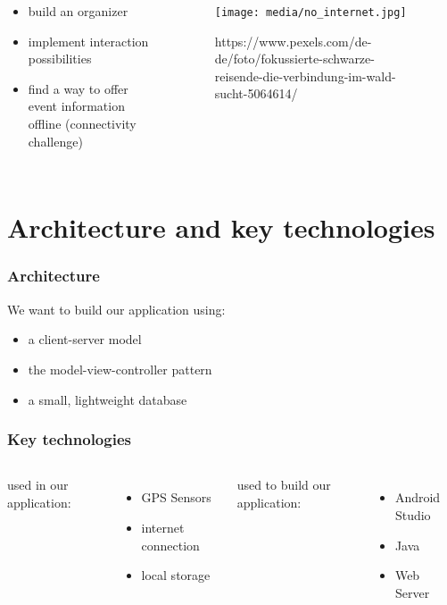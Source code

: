 \documentclass[aspectratio=169]{beamer}
\begin{document}
\begin{frame}
\begin{columns}
	\begin{itemize}
		\item build an organizer 
		\item implement interaction possibilities
		\item find a way to offer event information offline (connectivity challenge)
	\end{itemize}
	 \begin{figure}
	 \centering
	\texttt{[image: media/no\_internet.jpg]}
	\caption{https://www.pexels.com/de-de/foto/fokussierte-schwarze-reisende-die-verbindung-im-wald-sucht-5064614/}
\end{figure}
\end{columns}
\end{frame}




\section{Architecture and key technologies}
\begin{frame}
\frametitle{Architecture}
We want to build our application using:
	\begin{itemize}
		\item a client-server model 
		\item the model-view-controller pattern
		\item a small, lightweight database
	\end{itemize}
\end{frame}

\begin{frame}
\frametitle{Key technologies}
	\begin{columns}
used in our application:
  \begin{itemize}
		\item GPS Sensors 
		\item internet connection
		\item local storage
  \end{itemize}
    used to build our application:
  \begin{itemize}
		\item Android Studio
		\item Java
		\item Web Server
  \end{itemize}
\end{columns}
\end{frame}
\end{document}
